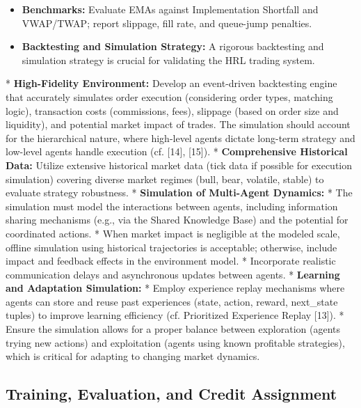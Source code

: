 \documentclass[11pt]{article}
\begin{document}
\begin{itemize}
\item   \textbf{Benchmarks:} Evaluate EMAs against Implementation Shortfall and VWAP/TWAP; report slippage, fill rate, and queue-jump penalties.

\item   \textbf{Backtesting and Simulation Strategy:} A rigorous backtesting and simulation strategy is crucial for validating the HRL trading system.
\end{itemize}
    *   \textbf{High-Fidelity Environment:} Develop an event-driven backtesting engine that accurately simulates order execution (considering order types, matching logic), transaction costs (commissions, fees), slippage (based on order size and liquidity), and potential market impact of trades. The simulation should account for the hierarchical nature, where high-level agents dictate long-term strategy and low-level agents handle execution (cf. [14], [15]).
    *   \textbf{Comprehensive Historical Data:} Utilize extensive historical market data (tick data if possible for execution simulation) covering diverse market regimes (bull, bear, volatile, stable) to evaluate strategy robustness.
    *   \textbf{Simulation of Multi-Agent Dynamics:}
        *   The simulation must model the interactions between agents, including information sharing mechanisms (e.g., via the Shared Knowledge Base) and the potential for coordinated actions.
        *   When market impact is negligible at the modeled scale, offline simulation using historical trajectories is acceptable; otherwise, include impact and feedback effects in the environment model.
        *   Incorporate realistic communication delays and asynchronous updates between agents.
    *   \textbf{Learning and Adaptation Simulation:}
        *   Employ experience replay mechanisms where agents can store and reuse past experiences (state, action, reward, next\_state tuples) to improve learning efficiency (cf. Prioritized Experience Replay [13]).
        *   Ensure the simulation allows for a proper balance between exploration (agents trying new actions) and exploitation (agents using known profitable strategies), which is critical for adapting to changing market dynamics.

\subsection{Training, Evaluation, and Credit Assignment}
\end{document}
